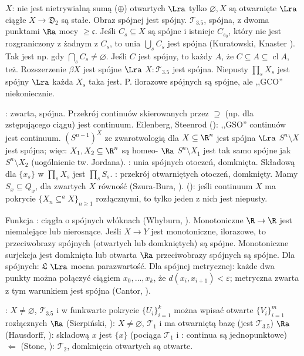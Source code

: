   $X$: nie jest nietrywialną sumą ($\oplus$) otwartych $\Lra$ tylko $\varnothing, X$ są otwarnięte $\Lra$ ciągłe $X \to \mathfrak D_2$ są stałe.
Obraz spójnej jest spójny. %
$\mathcal T_{3.5}$, spójna, z dwoma punktami $\Ra$ mocy $\ge \mathfrak c$. %
Jeśli $C_s \subseteq X$ są spójne i istnieje $C_{s_0}$, który nie jest rozgraniczony z żadnym z $C_s$, to unia $\bigcup_s C_s$ jest spójna (Kuratowski, Knaster ). %
Tak jest np. gdy $\bigcap_s C_s \neq \varnothing$.
Jeśli $C$ jest spójny, to każdy $A$, że $C \subseteq A \subseteq \operatorname{cl} A$, też. 
Rozszerzenie $\beta X$ jest spójne $\Lra$ $X : \mathcal T_{3.5}$ jest spójna.
Niepusty $\prod_s X_s$ jest spójny $\Lra$ każda $X_s$ taka jest.
P. ilorazowe spójnych są spójne, ale ,,GCO'' niekoniecznie.

: zwarta, spójna.
Przekrój continuów skierowanych przez $\supseteq$ (np. dla zstępującego ciągu) jest continuum.
Eilenberg, Steenrod (): ,,GSO'' continuów jest continuum. 
$(S^{n-1})^X$ ze zwarotwologią dla $X \subseteq \R^n$ jest spójna $\Lra$ $S^n \setminus X$ jest spójna; więc: $X_1, X_2 \subseteq \R^n$ są 
homeo- $\Ra$ $S^n \setminus X_1$ jest tak samo spójne jak $S^n \setminus X_2$ (uogólnienie tw. Jordana).
: unia spójnych otoczeń, domknięta.
Składową dla $\{x_s\}$ w $\prod_s X_s$ jest $\prod_s S_s$.
: przekrój otwarniętych otoczeń, domknięty.
Mamy $S_x \subseteq Q_x$, dla zwartych $X$ równość (Szura-Bura, ).
 (): jeśli continuum $X$ ma pokrycie $\{X_n \subseteq^a X\}_{n \ge 1}$ rozłącznymi, to tylko jeden z nich jest niepusty.

Funkcja : ciągła o spójnych włóknach (Whyburn, ).
Monotoniczne $\R \to \R$ jest niemalejące lub nierosnące.
Jeśli $X \to Y$ jest monotoniczne, ilorazowe, to przeciwobrazy spójnych (otwartych lub domkniętych) są spójne.
Monotoniczne surjekcja jest domknięta lub otwarta $\Ra$ przeciwobrazy spójnych są spójne.
Dla spójnych: $\mathfrak L$ $\Lra$ mocna parazwartość.
Dla spójnej metrycznej: każde dwa punkty można połączyć ciągiem $x_0, \dots, x_k$, że $d(x_i, x_{i+1}) < \varepsilon$; metryczna zwarta z tym warunkiem jest spójna (Cantor, ).



:  $X \neq \varnothing$, $\mathcal T_{3.5}$ i w funkwarte pokrycie $\{U_i\}_{i=1}^k$ można wpisać otwarte $\{V_i\}_{i=1}^m$ rozłącznych $\Ra$  (Sierpiński, ): $X\neq \varnothing$, $\mathcal T_1$ i ma otwarniętą bazę (jest $ \mathcal T_{3.5}$) $\Ra$  (Hausdorff, ): składową $x$ jest $\{x\}$ (pociąga $\mathcal T_1$ i : continua są jednopunktowe) $\Leftarrow$  (Stone, ): $\mathcal T_2$, domknięcia otwartych są otwarte.


